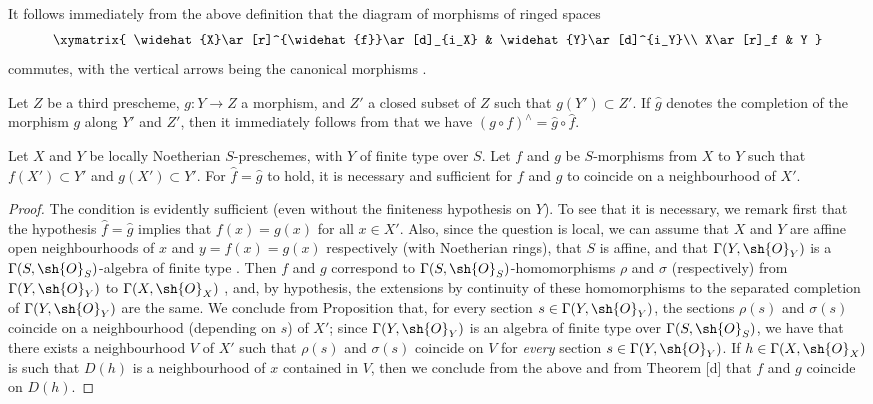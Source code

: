 \begin{env}[10.9.2]
\label{I.10.9.2}
It follows immediately from the above definition that the diagram of morphisms of ringed spaces
\[
  \xymatrix{
    \widehat{X}\ar[r]^{\widehat{f}}\ar[d]_{i_X} &
    \widehat{Y}\ar[d]^{i_Y}\\
    X\ar[r]_f &
    Y
  }
\]
commutes, with the vertical arrows being the canonical morphisms .
\end{env}

\begin{env}[10.9.3]
\label{I.10.9.3}
Let $Z$ be a third prescheme, $g:Y\to Z$ a morphism, and $Z'$ a closed subset of $Z$ such that $g(Y')\subset Z'$.
If $\widehat{g}$ denotes the completion of the morphism $g$ along $Y'$ and $Z'$, then it immediately follows from  that we have $(g\circ f)^\wedge=\widehat{g}\circ\widehat{f}$.
\end{env}

\begin{proposition}[10.9.4]
\label{I.10.9.4}
Let $X$ and $Y$ be locally Noetherian $S$-preschemes, with $Y$ of finite type over $S$.
Let $f$ and $g$ be $S$-morphisms from $X$ to $Y$ such that $f(X')\subset Y'$ and $g(X')\subset Y'$.
For $\widehat{f}=\widehat{g}$ to hold, it is necessary and sufficient for $f$ and $g$ to coincide on a neighbourhood of $X'$.
\end{proposition}

\begin{proof}
The condition is evidently sufficient (even without the finiteness hypothesis on $Y$).
To see that it is necessary, we remark first that the hypothesis $\widehat{f}=\widehat{g}$ implies that $f(x)=g(x)$ for all $x\in X'$.
Also, since the question is local, we can assume that $X$ and $Y$ are affine open neighbourhoods of $x$ and $y=f(x)=g(x)$ respectively (with Noetherian rings), that $S$ is affine, and that $\Gamma(Y,\sh{O}_Y)$ is a $\Gamma(S,\sh{O}_S)$-algebra of finite type .
Then $f$ and $g$ correspond to $\Gamma(S,\sh{O}_S)$-homomorphisms $\rho$ and $\sigma$ (respectively) from $\Gamma(Y,\sh{O}_Y)$ to $\Gamma(X,\sh{O}_X)$ , and, by hypothesis, the extensions by continuity of these homomorphisms to the separated completion of $\Gamma(Y,\sh{O}_Y)$ are the same.
We conclude from Proposition  that, for every section $s\in\Gamma(Y,\sh{O}_Y)$, the sections $\rho(s)$ and $\sigma(s)$ coincide on a neighbourhood (depending on $s$) of $X'$; since $\Gamma(Y,\sh{O}_Y)$ is an algebra of finite type over $\Gamma(S,\sh{O}_S)$, we have that there exists a neighbourhood $V$ of $X'$ such that $\rho(s)$ and $\sigma(s)$ coincide on $V$ for \emph{every} section $s\in\Gamma(Y,\sh{O}_Y)$.
If $h\in\Gamma(X,\sh{O}_X)$ is such that $D(h)$ is a neighbourhood of $x$ contained in $V$, then we conclude from the above and from Theorem [d] that $f$ and $g$ coincide on $D(h)$.
\end{proof}

